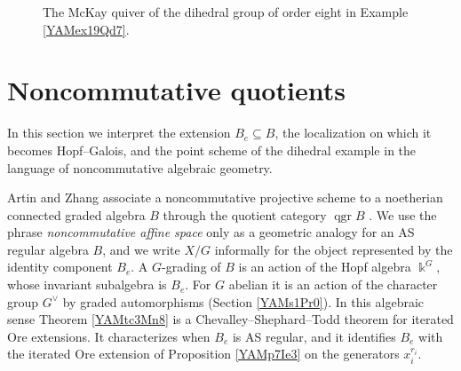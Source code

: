 \documentclass[reqno]{amsart}
\numberwithin{equation}{section}
\theoremstyle{definition}
\theoremstyle{remark}
\theoremstyle{plain}
\newcommand{\kk}{\Bbbk}
\begin{document}
\begin{figure}[H]
\centering
{}
\caption{The McKay quiver of the dihedral group of order eight in Example \ref{YAMex19Qd7}.}
\label{YAMfg2Dh3}
\end{figure}


\section{Noncommutative quotients}\label{YAMs9Gq1}
In this section we interpret the extension $B_e\subseteq B$, the localization on which it becomes Hopf--Galois, and the point scheme of the dihedral example in the language of noncommutative algebraic geometry.

Artin and Zhang associate a noncommutative projective scheme to a noetherian connected graded algebra $B$ through the quotient category $\operatorname{qgr}B$ \cite{AZ}. We use the phrase \emph{noncommutative affine space} only as a geometric analogy for an AS regular algebra $B$, and we write $X/G$ informally for the object represented by the identity component $B_e$. A $G$-grading of $B$ is an action of the Hopf algebra $\kk^G$, whose invariant subalgebra is $B_e$. For $G$ abelian it is an action of the character group $G^\vee$ by graded automorphisms (Section \ref{YAMs1Pr0}). In this algebraic sense Theorem \ref{YAMtc3Mn8} is a Chevalley--Shephard--Todd theorem for iterated Ore extensions. It characterizes when $B_e$ is AS regular, and it identifies $B_e$ with the iterated Ore extension of Proposition \ref{YAMp7Ie3} on the generators $x_i^{r_i}$.
\end{document}
